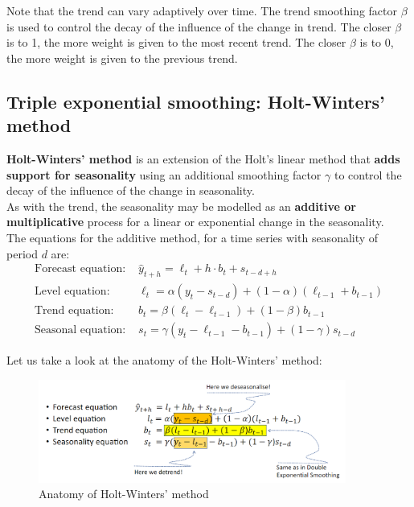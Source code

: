 Note that the trend can vary adaptively over time. The trend smoothing factor $\beta$
is used to control the decay of the influence of the change in trend. The closer
$\beta$ is to 1, the more weight is given to the most recent trend. The closer
$\beta$ is to 0, the more weight is given to the previous trend.

\subsection{Triple exponential smoothing: Holt-Winters' method}

\textbf{Holt-Winters' method} is an extension of the Holt's linear method that
\textbf{adds support for seasonality} using an additional smoothing factor $\gamma$
to control the decay of the influence of the change in seasonality.\\

As with the trend, the seasonality may be modelled as an \textbf{additive or 
multiplicative} process for a linear or exponential change in the seasonality.\\

The equations for the additive method, for a time series with seasonality of period
$d$ are:
\begin{align*}
    \text{Forecast equation: } &\hat{y}_{t+h} = \ell_t + h \cdot b_t + s_{t-d+h}\\
    \text{Level equation: } &\ell_t = \alpha(y_t - s_{t-d}) + (1 - \alpha)(\ell_{t-1} + b_{t-1})\\
    \text{Trend equation: } &b_t = \beta(\ell_t - \ell_{t-1}) + (1 - \beta)b_{t-1}\\
    \text{Seasonal equation: } &s_t = \gamma(y_t - \ell_{t-1} - b_{t-1}) + (1 - \gamma)s_{t-d}
\end{align*}

Let us take a look at the anatomy of the Holt-Winters' method:

\begin{figure}[H]
    \centering
    \includegraphics[width=0.9\textwidth]{figures/holt_winters.png}
    \caption{Anatomy of Holt-Winters' method}
    \label{fig:holt_winters}
\end{figure}

